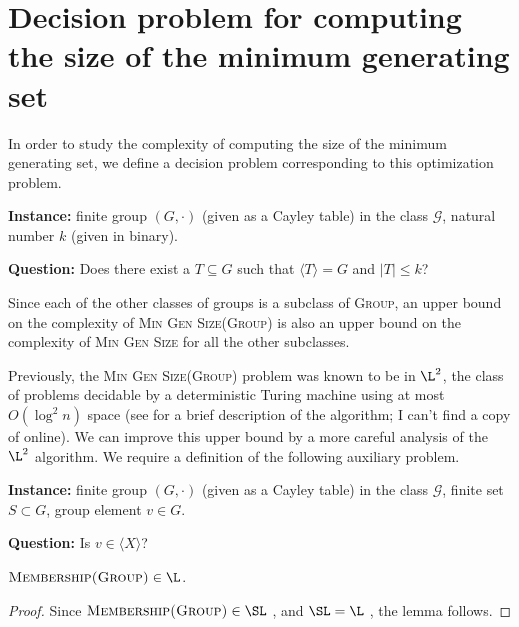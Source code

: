 \documentclass{article}
\newcommand{\gen}[1]{{\langle #1 \rangle}}
\begin{document}
\section{Decision problem for computing the size of the minimum generating set}

In order to study the complexity of computing the size of the minimum generating set, we define a decision problem corresponding to this optimization problem.

\begin{definition}
  \mbox{}

  \textbf{Instance:} finite group $(G, \cdot)$ (given as a Cayley table) in the class $\mathcal{G}$, natural number $k$ (given in binary).

  \textbf{Question:} Does there exist a $T \subseteq G$ such that $\gen{T} = G$ and $|T| \leq k$?
\end{definition}

Since each of the other classes of groups is a subclass of \textsc{Group}, an upper bound on the complexity of \textsc{Min Gen Size(Group)} is also an upper bound on the complexity of \textsc{Min Gen Size} for all the other subclasses.

Previously, the \textsc{Min Gen Size(Group)} problem was known to be in $\L^2$, the class of problems decidable by a deterministic Turing machine using at most $O(\log^2 n)$ space \cite{lsz77} (see \cite[Proposition~3]{at06} for a brief description of the algorithm; I can't find a copy of \cite{lsz77} online).
We can improve this upper bound by a more careful analysis of the $\L^2$ algorithm.
We require a definition of the following auxiliary problem.

\begin{definition}
  \mbox{}

  \textbf{Instance:} finite group $(G, \cdot)$ (given as a Cayley table) in the class $\mathcal{G}$, finite set $S \subset G$, group element $v \in G$.

  \textbf{Question:} Is $v \in \gen{X}$?
\end{definition}

\begin{lemma}\label{lem:membershipinl}
  $\textsc{Membership(Group)} \in \L$.
\end{lemma}
\begin{proof}
  Since $\textsc{Membership(Group)} \in \SL$ \cite[Section~3]{bm89}, and $\SL = \L$ \cite{reingold08}, the lemma follows.
\end{proof}
\end{document}
